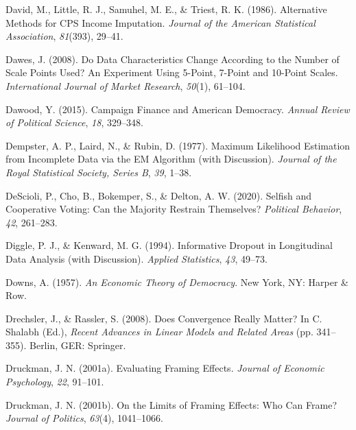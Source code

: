 \documentclass[12pt,econ]{sources/authesis}
\newenvironment{CSLReferences}%
  {}%
  {\par}
\begin{document}
\begin{CSLReferences}{1}{0}
\leavevmode{}%
David, M., Little, R. J., Samuhel, M. E., \& Triest, R. K. (1986). {Alternative Methods for CPS Income Imputation}. \emph{Journal of the American Statistical Association}, \emph{81}(393), 29--41.

\leavevmode{}%
Dawes, J. (2008). {Do Data Characteristics Change According to the Number of Scale Points Used? An Experiment Using 5-Point, 7-Point and 10-Point Scales}. \emph{International Journal of Market Research}, \emph{50}(1), 61--104.

\leavevmode{}%
Dawood, Y. (2015). Campaign {Finance} and {American} {Democracy}. \emph{Annual Review of Political Science}, \emph{18}, 329--348.

\leavevmode{}%
Dempster, A. P., Laird, N., \& Rubin, D. (1977). {Maximum Likelihood Estimation from Incomplete Data via the EM Algorithm (with Discussion)}. \emph{Journal of the Royal Statistical Society, Series B}, \emph{39}, 1--38.

\leavevmode{}%
DeScioli, P., Cho, B., Bokemper, S., \& Delton, A. W. (2020). {Selfish and Cooperative Voting: Can the Majority Restrain Themselves?} \emph{Political Behavior}, \emph{42}, 261--283.

\leavevmode{}%
Diggle, P. J., \& Kenward, M. G. (1994). {Informative Dropout in Longitudinal Data Analysis (with Discussion)}. \emph{Applied Statistics}, \emph{43}, 49--73.

\leavevmode{}%
Downs, A. (1957). \emph{An {Economic} {Theory} of {Democracy}}. New York, NY: Harper \& Row.

\leavevmode{}%
Drechsler, J., \& Rassler, S. (2008). {Does Convergence Really Matter?} In C. Shalabh (Ed.), \emph{{Recent Advances in Linear Models and Related Areas}} (pp. 341--355). Berlin, GER: Springer.

\leavevmode{}%
Druckman, J. N. (2001a). Evaluating {Framing} {Effects}. \emph{Journal of Economic Psychology}, \emph{22}, 91--101.

\leavevmode{}%
Druckman, J. N. (2001b). On the {Limits} of {Framing} {Effects}: {Who} {Can} {Frame}? \emph{Journal of Politics}, \emph{63}(4), 1041--1066.


\end{CSLReferences}
\end{document}

